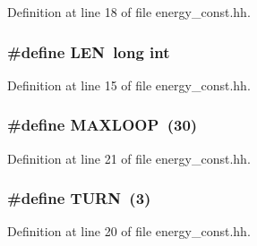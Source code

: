 Definition at line 18 of file energy\+\_\+const.\+hh.

\hypertarget{energy__const_8hh_a05b49c662c073f89e86804f7856622a0}{
\subsubsection[{L\+E\+N}]{\setlength{\rightskip}{0pt plus 5cm}\#define L\+E\+N~long int}}\label{energy__const_8hh_a05b49c662c073f89e86804f7856622a0}


Definition at line 15 of file energy\+\_\+const.\+hh.

\hypertarget{energy__const_8hh_ad1bd6eabac419670ddd3c9ed82145988}{
\subsubsection[{M\+A\+X\+L\+O\+O\+P}]{\setlength{\rightskip}{0pt plus 5cm}\#define M\+A\+X\+L\+O\+O\+P~(30)}}\label{energy__const_8hh_ad1bd6eabac419670ddd3c9ed82145988}


Definition at line 21 of file energy\+\_\+const.\+hh.

\hypertarget{energy__const_8hh_ae646250fd59311356c7e5722a81c3a96}{
\subsubsection[{T\+U\+R\+N}]{\setlength{\rightskip}{0pt plus 5cm}\#define T\+U\+R\+N~(3)}}\label{energy__const_8hh_ae646250fd59311356c7e5722a81c3a96}


Definition at line 20 of file energy\+\_\+const.\+hh.

